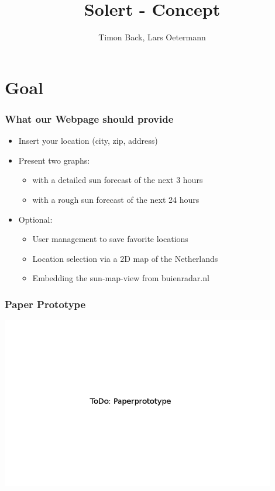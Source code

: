 \documentclass{beamer}
\title{Solert - Concept}
\author{Timon Back, Lars Oetermann}
\date[]{}
\begin{document}
\frame{\titlepage}

\section{Goal}
\frame
{
\frametitle{What our Webpage should provide}
  \begin{itemize}
   \item Insert your location (city, zip, address)
   \item Present two graphs:
      \begin{itemize} 
	\item with a detailed sun forecast of the next 3 hours
	\item with a rough sun forecast of the next 24 hours
	\end{itemize}
    \item Optional:
      \begin{itemize}
       \item User management to save favorite locations
       \item Location selection via a 2D map of the Netherlands
       \item Embedding the sun-map-view from buienradar.nl
      \end{itemize}

  \end{itemize}

}

\begin{frame}
 
 \frametitle{Paper Prototype}
 \includegraphics[width=0.9\textwidth]{paperprototype.png}

\end{frame}
\end{document}
